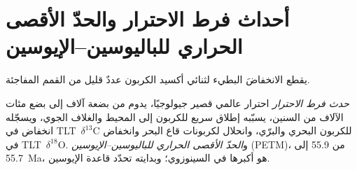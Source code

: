 \section{أحداث فرط الاحترار والحدّ الأقصى الحراري للباليوسين--الإيوسين}\label{sec:b2:deep-time-climate:petm}

يقطع الانخفاضَ البطيء لثنائي أكسيد الكربون عددٌ قليل من القمم المفاجئة.

\begin{definition}\label{def:b2:deep-time-climate:petm}
\emph{حدث فرط الاحترار} احترار عالمي قصير جيولوجيًا، يدوم من بضعة
آلاف إلى بضع مئات الآلاف من السنين، يسبّبه إطلاق سريع للكربون إلى المحيط
والغلاف الجوي، ويسجّله انخفاض في \mbox{\textdir TLT $\delta^{13}$C} للكربون البحري والبرّي،
وانحلال لكربونات قاع البحر وانخفاض في \mbox{\textdir TLT $\delta^{18}$O}. و\emph{الحدّ الأقصى الحراري
للباليوسين--الإيوسين} (PETM)، من 55.9 إلى \qty{55.7}{Ma}، هو
أكبرها في السينوزوي؛ وبدايته تحدّد قاعدة الإيوسين.
\end{definition}

